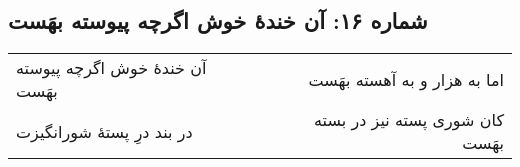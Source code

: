 \begin{center}
\section*{شماره ۱۶: آن خندۀ خوش اگرچه پیوسته بهَست}
\label{sec:016}
\begin{longtable}{l p{0.5cm} r}
آن خندهٔ خوش اگرچه پیوسته بهَست
&&
اما به هزار و به آهسته بهَست
\\
در بند درِ پستهٔ شورانگیزت
&&
کان شوری پسته نیز در بسته بهَست
\\
\end{longtable}
\end{center}
